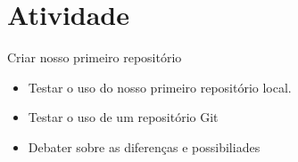 \documentclass{beamer}
\begin{document}
\section{Atividade}

\begin{frame}{Criar nosso primeiro repositório}
      \begin{itemize}
            \item Testar o uso do nosso primeiro repositório local.
            \item Testar o uso de um repositório Git
            \item Debater sobre as diferenças e possibiliades
      \end{itemize}
\end{frame}


\backmatter
\end{document}
